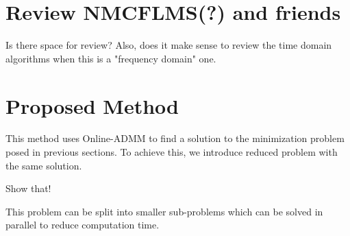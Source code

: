 \documentclass{article}
\newcommand{\h}{\mtxb{h}}
\newcommand{\R}{\mtxb{R}}
\begin{document}

\section{Review NMCFLMS(?) and friends}
\label{sec:reviewf_mc_n}
\begin{attention}
    Is there space for review? Also, does it make sense to review the time domain algorithms when this is a "frequency domain" one. 
\end{attention}

\section{Proposed Method}
\label{sec:proposed_method}
This method uses Online-ADMM to find a solution to the minimization problem posed in previous sections.
To achieve this, we introduce reduced problem with the same solution.
\begin{attention}
    Show that!
\end{attention}
This problem can be split into smaller sub-problems which can be solved in parallel to reduce computation time.
\end{document}

